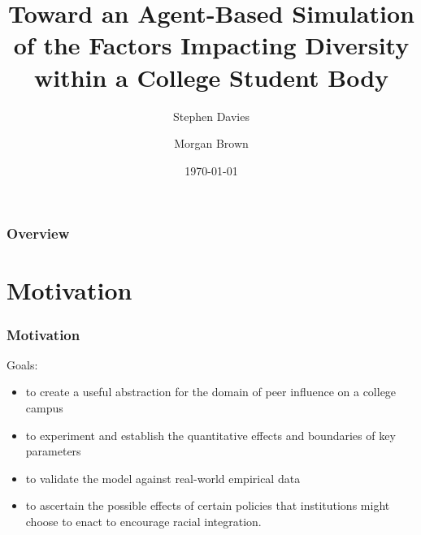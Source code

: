 \documentclass{beamer}
\title[]{Toward an Agent-Based Simulation of the Factors Impacting Diversity within a College Student Body} %
\author{Stephen Davies \inst{1} \and Morgan Brown \inst{2}} %
\institute[] %
{
\inst{1} University of Mary Washington \and \inst{2} University of Wisconsin - Madison\\ %
}
\date{\today} %
\begin{document}
\begin{frame}
\titlepage %
\end{frame}

\begin{frame}
\frametitle{Overview} %
\tableofcontents %
\end{frame}


\section{Motivation} %


\begin{frame}
\frametitle{Motivation}
Goals:

\begin{itemize}
\itemsep.1em
\item to create a useful abstraction for the domain of peer influence on a
college campus
\item to experiment and establish the quantitative effects and boundaries of
key parameters
\item to validate the model against real-world empirical data
\item to ascertain the possible effects of certain policies that institutions might choose to enact to encourage racial integration.
\end{itemize}

\end{frame}
\end{document}

